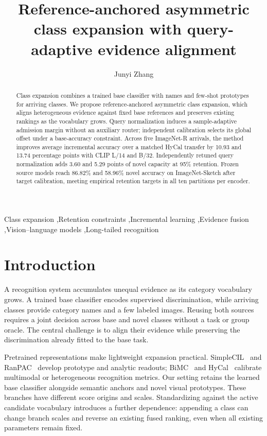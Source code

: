 \documentclass[preprint,review,12pt]{elsarticle}
\begin{document}
\begin{frontmatter}
\title{Reference-anchored asymmetric class expansion with query-adaptive evidence alignment}
\author[sdu]{Junyi Zhang}
\begin{abstract}
Class expansion combines a trained base classifier with names and few-shot prototypes for arriving classes. We propose reference-anchored asymmetric class expansion, which aligns heterogeneous evidence against fixed base references and preserves existing rankings as the vocabulary grows. Query normalization induces a sample-adaptive admission margin without an auxiliary router; independent calibration selects its global offset under a base-accuracy constraint. Across five ImageNet-R arrivals, the method improves average incremental accuracy over a matched HyCal transfer by 10.93 and 13.74 percentage points with CLIP L/14 and B/32. Independently retuned query normalization adds 3.60 and 5.29 points of novel capacity at 95\% retention. Frozen source models reach 86.82\% and 58.96\% novel accuracy on ImageNet-Sketch after target calibration, meeting empirical retention targets in all ten partitions per encoder.
\end{abstract}
\begin{keyword}
Class expansion \sep Retention constraints \sep Incremental learning \sep Evidence fusion \sep Vision--language models \sep Long-tailed recognition
\end{keyword}
\end{frontmatter}

\section{Introduction}
A recognition system accumulates unequal evidence as its category vocabulary grows. A trained base classifier encodes supervised discrimination, while arriving classes provide category names and a few labeled images. Reusing both sources requires a joint decision across base and novel classes without a task or group oracle. The central challenge is to align their evidence while preserving the discrimination already fitted to the base task.

Pretrained representations make lightweight expansion practical. SimpleCIL~\cite{zhou2024simplecil} and RanPAC~\cite{mcdonnell2023ranpac} develop prototype and analytic readouts; BiMC~\cite{chen2025bimc} and HyCal~\cite{lee2026hycal} calibrate multimodal or heterogeneous recognition metrics. Our setting retains the learned base classifier alongside semantic anchors and novel visual prototypes. These branches have different score origins and scales. Standardizing against the active candidate vocabulary introduces a further dependence: appending a class can change branch scales and reverse an existing fused ranking, even when all existing parameters remain fixed.
\end{document}

